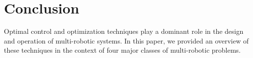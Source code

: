 
\section{Conclusion}\label{sec:5}
Optimal control and optimization techniques play a dominant role in the design and operation of multi-robotic systems. In this paper, we provided an overview of these techniques in the context of four major classes of multi-robotic problems. 


